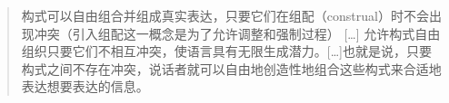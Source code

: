 \begin{quote}
构式可以自由组合并组成真实表达，只要它们在组配（construal）时不会出现冲突（引入组配这一概念是为了允许调整和强制过程）
[\ldots]
允许构式自由组织只要它们不相互冲突，使语言具有无限生成潜力。[\ldots]也就是说，只要构式之间不存在冲突，说话者就可以自由地创造性地组合这些构式来合适地表达想要表达的信息。\citep[]{Goldberg2006a} 
\end{quote}

